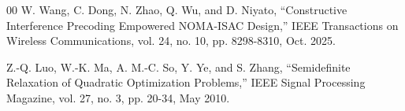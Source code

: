 \documentclass[10pt,journal,compsoc]{IEEEtran}
\begin{document}
\begin{thebibliography}{00}
W. Wang, C. Dong, N. Zhao, Q. Wu, and D. Niyato,
``Constructive Interference Precoding Empowered NOMA-ISAC Design,''
IEEE Transactions on Wireless Communications, vol. 24, no. 10, pp. 8298-8310, Oct. 2025.

Z.-Q. Luo, W.-K. Ma, A. M.-C. So, Y. Ye, and S. Zhang,
``Semidefinite Relaxation of Quadratic Optimization Problems,''
IEEE Signal Processing Magazine,
vol. 27, no. 3, pp. 20-34, May 2010.

\end{thebibliography}
\end{document}
